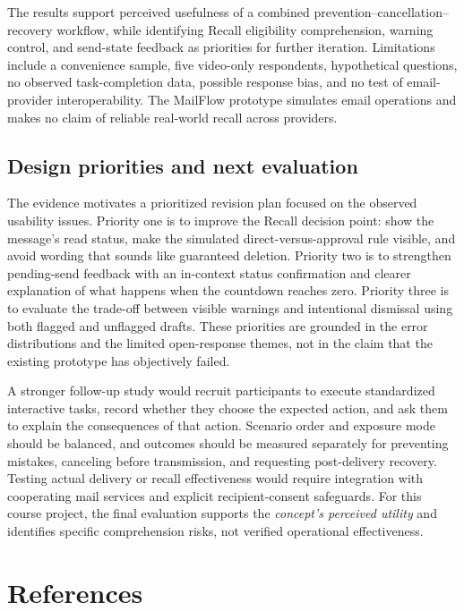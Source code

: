 \documentclass[letterpaper]{jdf}
\begin{document}
The results support perceived usefulness of a combined prevention--cancellation--recovery workflow, while identifying Recall eligibility comprehension, warning control, and send-state feedback as priorities for further iteration. Limitations include a convenience sample, five video-only respondents, hypothetical questions, no observed task-completion data, possible response bias, and no test of email-provider interoperability. The MailFlow prototype simulates email operations and makes no claim of reliable real-world recall across providers.

\subsection{Design priorities and next evaluation}
The evidence motivates a prioritized revision plan focused on the observed usability issues. Priority one is to improve the Recall decision point: show the message's read status, make the simulated direct-versus-approval rule visible, and avoid wording that sounds like guaranteed deletion. Priority two is to strengthen pending-send feedback with an in-context status confirmation and clearer explanation of what happens when the countdown reaches zero. Priority three is to evaluate the trade-off between visible warnings and intentional dismissal using both flagged and unflagged drafts. These priorities are grounded in the error distributions and the limited open-response themes, not in the claim that the existing prototype has objectively failed.

A stronger follow-up study would recruit participants to execute standardized interactive tasks, record whether they choose the expected action, and ask them to explain the consequences of that action. Scenario order and exposure mode should be balanced, and outcomes should be measured separately for preventing mistakes, canceling before transmission, and requesting post-delivery recovery. Testing actual delivery or recall effectiveness would require integration with cooperating mail services and explicit recipient-consent safeguards. For this course project, the final evaluation supports the \emph{concept's perceived utility} and identifies specific comprehension risks, not verified operational effectiveness.

\label{body-end-for-audit}
\section{References}
\printbibliography[heading=none]
\end{document}

